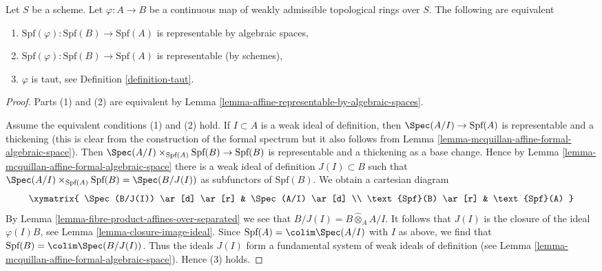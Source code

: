 \begin{lemma}
\label{lemma-representable-affine}
Let $S$ be a scheme. Let $\varphi : A \to B$ be a continuous map of
weakly admissible topological rings over $S$. The following
are equivalent
\begin{enumerate}
\item $\text{Spf}(\varphi) : \text{Spf}(B) \to \text{Spf}(A)$
is representable by algebraic spaces,
\item $\text{Spf}(\varphi) : \text{Spf}(B) \to \text{Spf}(A)$
is representable (by schemes),
\item $\varphi$ is taut, see Definition \ref{definition-taut}.
\end{enumerate}
\end{lemma}

\begin{proof}
Parts (1) and (2) are equivalent by
Lemma \ref{lemma-affine-representable-by-algebraic-spaces}.

\medskip\noindent
Assume the equivalent conditions (1) and (2) hold.
If $I \subset A$ is a weak ideal of definition, then
$\Spec(A/I) \to \text{Spf}(A)$ is representable and a thickening
(this is clear from the construction of the formal spectrum
but it also follows from
Lemma \ref{lemma-mcquillan-affine-formal-algebraic-space}).
Then $\Spec(A/I) \times_{\text{Spf}(A)} \text{Spf}(B) \to \text{Spf}(B)$
is representable and a thickening as a base change.
Hence by
Lemma \ref{lemma-mcquillan-affine-formal-algebraic-space}
there is a weak ideal of definition $J(I) \subset B$ such that
$\Spec(A/I) \times_{\text{Spf}(A)} \text{Spf}(B) = \Spec(B/J(I))$
as subfunctors of $\text{Spf}(B)$. We obtain a cartesian diagram
$$
\xymatrix{
\Spec(B/J(I)) \ar[d] \ar[r] & \Spec(A/I) \ar[d] \\
\text{Spf}(B) \ar[r] & \text{Spf}(A)
}
$$
By Lemma \ref{lemma-fibre-product-affines-over-separated}
we see that $B/J(I) = B \widehat{\otimes}_A A/I$.
It follows that $J(I)$ is the closure of the ideal $\varphi(I)B$, see
Lemma \ref{lemma-closure-image-ideal}.
Since $\text{Spf}(A) = \colim \Spec(A/I)$ with $I$ as above,
we find that $\text{Spf}(B) = \colim \Spec(B/J(I))$.
Thus the ideals $J(I)$ form a fundamental system of weak
ideals of definition (see
Lemma \ref{lemma-mcquillan-affine-formal-algebraic-space}).
Hence (3) holds.


\end{proof}
